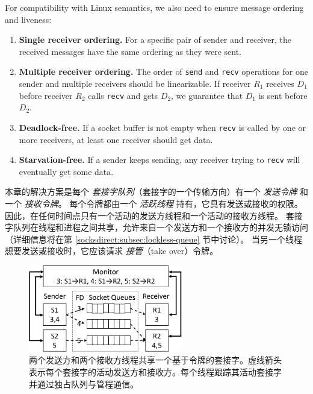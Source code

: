 For compatibility with Linux semantics, we also need to ensure message ordering and liveness:
\begin{enumerate}
\item \textbf{Single receiver ordering.} For a specific pair of sender and receiver, the received messages have the same ordering as they were sent.
\item \textbf{Multiple receiver ordering.} The order of \texttt{send} and \texttt{recv} operations for one sender and multiple receivers should be linearizable. If receiver $R_1$ receives $D_1$ before receiver $R_2$ calls \texttt{recv} and gets $D_2$, we guarantee that $D_1$ is sent before $D_2$.
\item \textbf{Deadlock-free.} If a socket buffer is not empty when \texttt{recv} is called by one or more receivers, at least one receiver should get data.
\item \textbf{Starvation-free.} If a sender keeps sending, any receiver trying to \texttt{recv} will eventually get some data.
\end{enumerate}
\fi

本章的解决方案是每个 \emph {套接字队列}（套接字的一个传输方向）有一个 \emph {发送令牌} 和一个 \emph {接收令牌}。
每个令牌都由一个 \emph {活跃线程} 持有，它具有发送或接收的权限。
因此，在任何时间点只有一个活动的发送方线程和一个活动的接收方线程。
套接字队列在线程和进程之间共享，允许来自一个发送方和一个接收方的并发无锁访问（详细信息将在第 \ref {socksdirect:subsec:lockless-queue} 节中讨论）。
当另一个线程想要发送或接收时，它应该请求 \emph {接管}（take over）令牌。



\begin{figure}[htbp]
	\centering
	\includegraphics[width=0.6\textwidth]{images/queue_arch}
	\caption{两个发送方和两个接收方线程共享一个基于令牌的套接字。虚线箭头表示每个套接字的活动发送方和接收方。每个线程跟踪其活动套接字并通过独占队列与管程通信。}
	\label{socksdirect:fig:queue-arch}
\end{figure}



